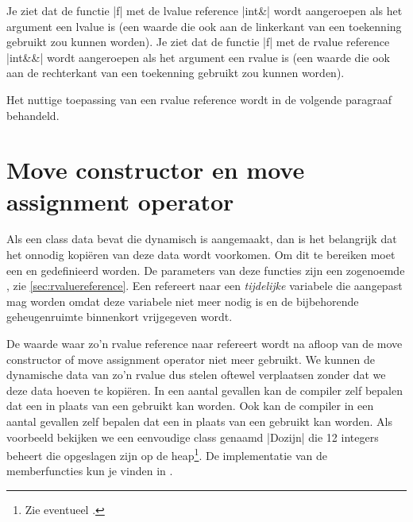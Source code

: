 \begin{cpplstShortInline}
Je ziet dat de functie |f| met de lvalue reference |int&| wordt aangeroepen als het argument een lvalue is (een waarde die ook aan de linkerkant van een toekenning gebruikt zou kunnen worden).
Je ziet dat de functie |f| met de rvalue reference |int&&| wordt aangeroepen als het argument een rvalue is (een waarde die ook aan de rechterkant van een toekenning gebruikt zou kunnen worden).

Het nuttige toepassing van een rvalue reference wordt in de volgende paragraaf behandeld.

\section{Move constructor en move assignment operator}
\label{sec:move}
Als een class data bevat die dynamisch is aangemaakt, dan is het belangrijk dat het onnodig kopiëren van deze data wordt voorkomen.
Om dit te bereiken moet een \emph{} en \emph{} gedefinieerd worden.
De parameters van deze  functies zijn een zogenoemde , zie \cref{sec:rvaluereference}.
Een  refereert naar een \emph{tijdelijke} variabele die aangepast mag worden omdat deze variabele niet meer nodig is en de bijbehorende geheugenruimte binnenkort vrijgegeven wordt.

De waarde waar zo'n rvalue reference naar refereert wordt na afloop van de move constructor of move assignment operator niet meer gebruikt.
We kunnen de dynamische data van zo'n rvalue dus stelen oftewel verplaatsen zonder dat we deze data hoeven te kopiëren.
In een aantal gevallen kan de compiler zelf bepalen dat een  in plaats van een  gebruikt kan worden.
Ook kan de compiler in een aantal gevallen zelf bepalen dat een  in plaats van een  gebruikt kan worden.
Als voorbeeld bekijken we een eenvoudige class genaamd |Dozijn| die 12 integers beheert die opgeslagen zijn op de heap\footnote{%
	Zie eventueel .
}.
De implementatie van de memberfuncties kun je vinden in .


\end{cpplstShortInline}
